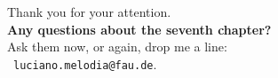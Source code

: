 \documentclass[aspectratio=169,t,xcolor=dvipsnames]{beamer}
\begin{document}
  { %
    \begin{frame}[c]
      \begin{center}
        Thank you for your attention.\\
        {\bf Any questions about the seventh chapter?}\\[0.5cm]
        Ask them now, or again, drop me a line: \\
        \faSendO \ \texttt{luciano.melodia@fau.de}.
      \end{center}
    \end{frame}
  }
\end{document}
